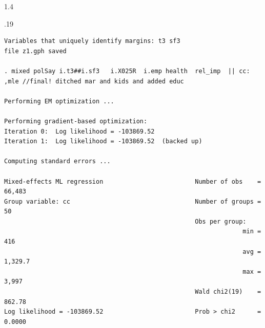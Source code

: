\documentclass[10pt, letterpaper]{article}
\begin{document}
\begin{spacing}{1.4}
\begin{scriptsize}
\begin{spacing}{.19}
\begin{verbatim}
Variables that uniquely identify margins: t3 sf3
file z1.gph saved

. mixed polSay i.t3##i.sf3   i.X025R  i.emp health  rel_imp  || cc:    ,mle //final! ditched mar and kids and added educ

Performing EM optimization ...

Performing gradient-based optimization: 
Iteration 0:  Log likelihood = -103869.52  
Iteration 1:  Log likelihood = -103869.52  (backed up)

Computing standard errors ...

Mixed-effects ML regression                         Number of obs    =  66,483
Group variable: cc                                  Number of groups =      50
                                                    Obs per group:
                                                                 min =     416
                                                                 avg = 1,329.7
                                                                 max =   3,997
                                                    Wald chi2(19)    =  862.78
Log likelihood = -103869.52                         Prob > chi2      =  0.0000


\end{verbatim}
\end{spacing}
\end{scriptsize}
\end{spacing}
\end{document}
